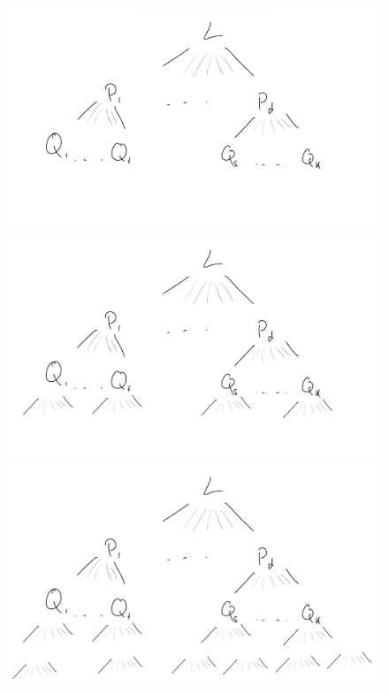 \documentclass{beamer}[10]
\begin{document}
\begin{frame}
\begin{figure}
\begin{overprint}
                \centering\includegraphics[scale=0.2]{Step3.PNG}
                \centering\includegraphics[scale=0.2]{Step4.PNG}
                \centering\includegraphics[scale=0.2]{Step5.PNG}
            \end{overprint}
        \end{figure}
\end{frame}
\end{document}
